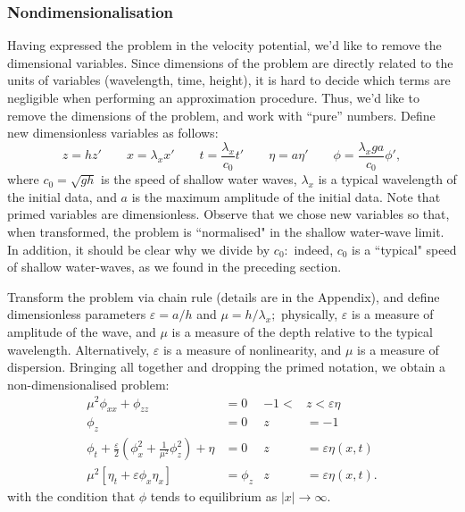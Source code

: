 \documentclass[10pt,reqno,oneside,a4paper]{article}
\begin{document}
\subsubsection{Nondimensionalisation}
Having expressed the problem in the velocity potential, we'd like to remove the dimensional variables. Since dimensions of the problem are directly related to the units of variables (wavelength, time, height), it is hard to decide which terms are negligible when performing an approximation procedure. Thus, we'd like to remove the dimensions of the problem, and work with ``pure'' numbers.  Define new dimensionless variables as follows:
\[ 
z = h z' \qquad x = \lambda_x x' \qquad t = \frac{\lambda_x}{c_0} t' \qquad \eta = a \eta' \qquad \phi  = \frac{\lambda_x ga}{c_0} \phi',
\]
where $c_0 = \sqrt{gh}$ is the speed of shallow water waves, $\lambda_x$ is a typical wavelength of the initial data, and $a$ is the maximum amplitude of the initial data. Note that primed variables are dimensionless. Observe that we chose new variables so that, when transformed, the problem is ``normalised" in the shallow water-wave limit. In addition, it should be clear why we divide by $c_0:$ indeed, $c_0$ is a ``typical" speed of shallow water-waves, as we found in the preceding section.

Transform the problem via chain rule (details are in the Appendix), and define dimensionless parameters $\varepsilon = a/h$ and $\mu = h/\lambda_x;$ physically, $\varepsilon$ is a measure of amplitude of the wave, and $\mu$ is a measure of the depth relative to the typical wavelength. Alternatively, $\varepsilon$ is a measure of nonlinearity, and $\mu$ is a measure of dispersion. Bringing all together and dropping the primed notation, we obtain a non-dimensionalised problem:
\begin{subequations}\label{WLP1DND1}
\begin{align}
\label{1PDEND1}  \mu^2 \phi_{xx} + \phi_{zz} &= 0 &-1 <&z < \varepsilon\eta \\
\label{1BC1ND1} \phi_z &= 0 &z &= -1  \\ 
\label{1BC2ND1} \phi_{t} + \frac{\varepsilon}{2} \left(\phi_{x}^2 + \frac{1}{\mu^2}\phi_{z}^2\right) + \eta &= 0 &z &= \varepsilon\eta(x,t)\\
\label{1BC3ND1} \mu^2 \left[\eta_{t} + \varepsilon \phi_{x} \eta_{x}\right] &= \phi_{z} &z &= \varepsilon\eta(x,t).
\end{align}
\end{subequations}
with the condition that $\phi$ tends to equilibrium as $|x|\to \infty.$ 
\end{document}
